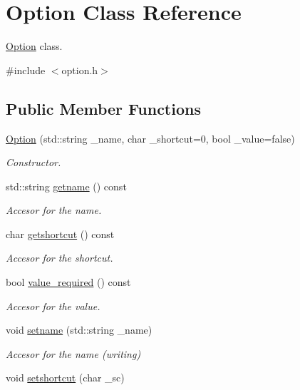 \hypertarget{class_option}{}\section{Option Class Reference}
\label{class_option}


\hyperlink{class_option}{Option} class.  




{\ttfamily \#include $<$option.\+h$>$}

\subsection*{Public Member Functions}
\begin{DoxyCompactItemize}
\item 
\hyperlink{class_option_a686af13adc828fe688e097c531816e58}{Option} (std\+::string \+\_\+name, char \+\_\+shortcut=0, bool \+\_\+value=false)
\begin{DoxyCompactList}\small\item\em Constructor. \end{DoxyCompactList}\item 
std\+::string \hyperlink{class_option_ad820e2fb8cc07899ff9ab9cbd4bed8bd}{getname} () const
\begin{DoxyCompactList}\small\item\em Accesor for the name. \end{DoxyCompactList}\item 
char \hyperlink{class_option_a14aaf12f3338434a47f7b69547118505}{getshortcut} () const
\begin{DoxyCompactList}\small\item\em Accesor for the shortcut. \end{DoxyCompactList}\item 
bool \hyperlink{class_option_a5ac713700e6cf3fb87736af5c4388f2a}{value\+\_\+required} () const
\begin{DoxyCompactList}\small\item\em Accesor for the value. \end{DoxyCompactList}\item 
void \hyperlink{class_option_a2a850c15f77b6e7e512295fba20ead9d}{setname} (std\+::string \+\_\+name)
\begin{DoxyCompactList}\small\item\em Accesor for the name (writing) \end{DoxyCompactList}\item 
void \hyperlink{class_option_a33f76f0cac38ae7bb7020d7e68cb68a7}{setshortcut} (char \+\_\+sc)

\end{DoxyCompactItemize}
